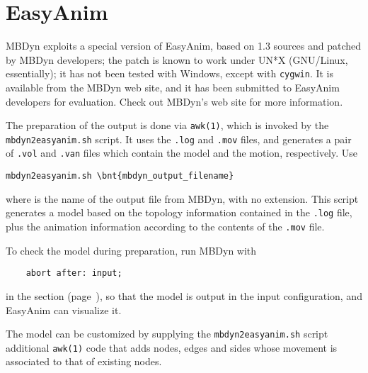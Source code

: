 \section{EasyAnim}
\label{sec:APP:OUTPUTRESULTS:EASYANIM}
MBDyn exploits a special version of EasyAnim, based on 1.3 sources
and patched by MBDyn developers; the patch is known to work under UN*X
(GNU/Linux, essentially); it has not been tested with Windows, except with
\texttt{cygwin}.
It is available from the MBDyn web site, and it has been submitted
to EasyAnim developers for evaluation.
Check out MBDyn's web site for more information.

The preparation of the output is done via \texttt{awk(1)}, which is invoked
by the \texttt{mbdyn2easyanim.sh} script.
It uses the \texttt{.log} and \texttt{.mov} files, and generates a pair of
\texttt{.vol} and \texttt{.van} files which contain the model and the motion,
respectively.
Use
\begin{Verbatim}[commandchars=\\\{\}]
    mbdyn2easyanim.sh \bnt{mbdyn_output_filename}
\end{Verbatim}
where  is the name of the output file from MBDyn,
with no extension.
This script generates a model based on the topology information
contained in the \texttt{.log} file, plus the animation information
according to the contents of the \texttt{.mov} file.

To check the model during preparation, run MBDyn with
\begin{verbatim}
    abort after: input;
\end{verbatim}
in the  section (page~\pageref{sec:IVP:abort after}),
so that the model is output in the input configuration,
and EasyAnim can visualize it.

The model can be customized by supplying the \texttt{mbdyn2easyanim.sh}
script additional \texttt{awk(1)} code that adds nodes, edges and sides 
whose movement is associated to that of existing nodes.


